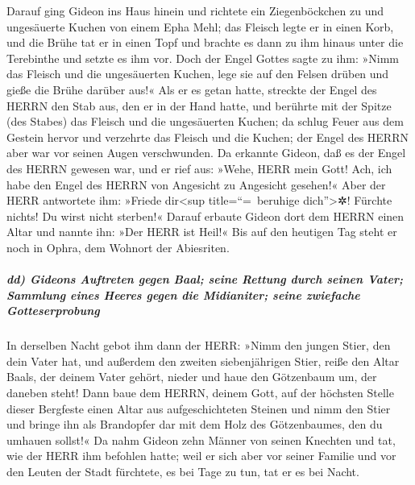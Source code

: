 Darauf ging Gideon ins Haus hinein und richtete ein
Ziegenböckchen zu und ungesäuerte Kuchen von einem Epha Mehl; das
Fleisch legte er in einen Korb, und die Brühe tat er in einen Topf und
brachte es dann zu ihm hinaus unter die Terebinthe und setzte es ihm
vor. Doch der Engel Gottes sagte zu ihm: »Nimm das
Fleisch und die ungesäuerten Kuchen, lege sie auf den Felsen drüben und
gieße die Brühe darüber aus!« Als er es getan hatte,
streckte der Engel des HERRN den Stab aus, den er in der
Hand hatte, und berührte mit der Spitze (des Stabes) das Fleisch und die
ungesäuerten Kuchen; da schlug Feuer aus dem Gestein hervor und
verzehrte das Fleisch und die Kuchen; der Engel des HERRN aber war vor
seinen Augen verschwunden. Da erkannte Gideon, daß es der
Engel des HERRN gewesen war, und er rief aus: »Wehe, HERR mein Gott!
Ach, ich habe den Engel des HERRN von Angesicht zu Angesicht gesehen!«
Aber der HERR antwortete ihm: »Friede dir\textless sup
title=``=~beruhige dich''\textgreater✲! Fürchte nichts! Du wirst nicht
sterben!« Darauf erbaute Gideon dort dem HERRN einen
Altar und nannte ihn: »Der HERR ist Heil!« Bis auf den heutigen Tag
steht er noch in Ophra, dem Wohnort der Abiesriten.

\hypertarget{dd-gideons-auftreten-gegen-baal-seine-rettung-durch-seinen-vater-sammlung-eines-heeres-gegen-die-midianiter-seine-zwiefache-gotteserprobung}{%
\subparagraph{dd) Gideons Auftreten gegen Baal; seine Rettung durch
seinen Vater; Sammlung eines Heeres gegen die Midianiter; seine
zwiefache
Gotteserprobung}\label{dd-gideons-auftreten-gegen-baal-seine-rettung-durch-seinen-vater-sammlung-eines-heeres-gegen-die-midianiter-seine-zwiefache-gotteserprobung}}

In derselben Nacht gebot ihm dann der HERR: »Nimm den
jungen Stier, den dein Vater hat, und außerdem den zweiten
siebenjährigen Stier, reiße den Altar Baals, der deinem Vater gehört,
nieder und haue den Götzenbaum um, der daneben steht!
Dann baue dem HERRN, deinem Gott, auf der höchsten Stelle
dieser Bergfeste einen Altar aus aufgeschichteten Steinen und nimm den
Stier und bringe ihn als Brandopfer dar mit dem Holz des Götzenbaumes,
den du umhauen sollst!« Da nahm Gideon zehn Männer von
seinen Knechten und tat, wie der HERR ihm befohlen hatte; weil er sich
aber vor seiner Familie und vor den Leuten der Stadt fürchtete, es bei
Tage zu tun, tat er es bei Nacht.

